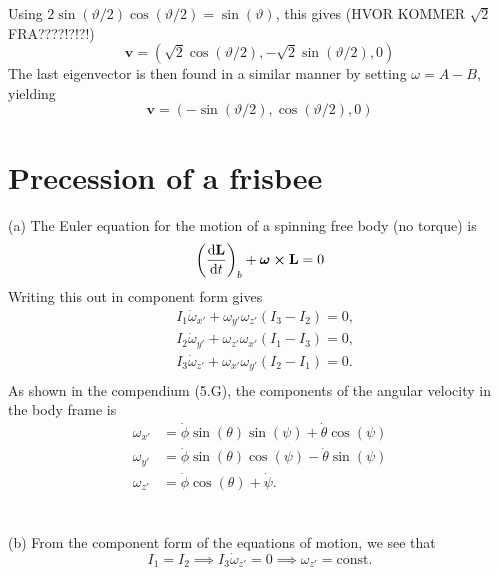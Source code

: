 \documentclass{article}
\begin{document}
        Using $2\sin(\vartheta/2) \cos(\vartheta/2) = \sin(\vartheta)$, this gives (HVOR KOMMER $\sqrt 2$ FRA????!?!?!)
        \begin{equation*}
            \mathbf{v} = \left( \sqrt 2 \cos(\vartheta/2), -\sqrt 2 \sin(\vartheta / 2), 0 \right)
        \end{equation*}
        The last eigenvector is then found in a similar manner by setting $\omega = A - B$, yielding
        \begin{equation*}
            \mathbf{v} = \left(-\sin(\vartheta/2), \cos(\vartheta/2), 0\right)
        \end{equation*}

    \section{Precession of a frisbee}
        (a) The Euler equation for the motion of a spinning free body (no torque) is 
        \begin{equation*}
            \left(\dv{\mathbf{L}}{t}\right)_b + \boldsymbol \omega \cross \mathbf{L} = 0
        \end{equation*}
        Writing this out in component form gives
        \begin{align*}
            & I_1 \dot \omega_{x'} + \omega_{y'}\omega_{z'}(I_3 - I_2) = 0, \\
            & I_2 \dot \omega_{y'} + \omega_{z'}\omega_{x'}(I_1 - I_3) = 0, \\
            & I_3 \dot \omega_{z'} + \omega_{x'}\omega_{y'}(I_2 - I_1) = 0 .\\
        \end{align*}
        As shown in the compendium (5.G), the components of the angular velocity in the body frame is 
        \begin{align*}
            \omega_{x'} & = \dot \phi \sin(\theta) \sin(\psi) + \dot\theta \cos(\psi) \\
            \omega_{y'} & = \dot \phi \sin(\theta)\cos(\psi) - \dot \theta  \sin(\psi)\\
            \omega_{z'} & = \dot \phi \cos(\theta) + \dot \psi.
        \end{align*}
        \\ \\
        (b) From the component form of the equations of motion, we see that 
        \begin{equation*}
            I_1 = I_2 \implies I_3 \dot \omega_{z'} = 0 \implies \omega_{z'} = \mathrm{const.}
        \end{equation*}
\end{document}
